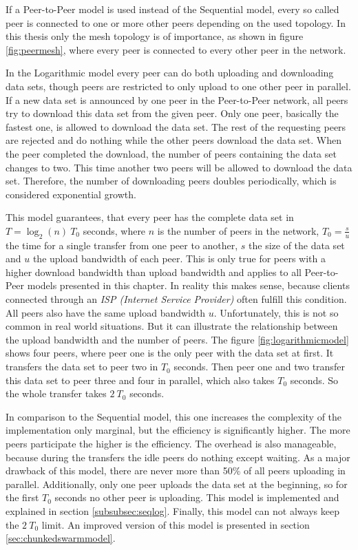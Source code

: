 If a Peer-to-Peer model is used instead of the Sequential model, every so called peer is connected to one or more other peers depending on the used topology. In this thesis only the mesh topology is of importance, as shown in figure \ref{fig:peermesh}, where every peer is connected to every other peer in the network.

In the Logarithmic model every peer can do both uploading and downloading data sets, though peers are restricted to only upload to one other peer in parallel. If a new data set is announced by one peer in the Peer-to-Peer network, all peers try to download this data set from the given peer. Only one peer, basically the fastest one, is allowed to download the data set. The rest of the requesting peers are rejected and do nothing while the other peers download the data set. When the peer completed the download, the number of peers containing the data set changes to two. This time another two peers will be allowed to download the data set. Therefore, the number of downloading peers doubles periodically, which is considered exponential growth.

This model guarantees, that every peer has the complete data set in $T=\log_{2}{(n)}\:T_0$  seconds, where $n$ is the number of peers in the network, $T_0=\frac{s}{u}$ the time for a single transfer from one peer to another, $s$ the size of the data set and $u$ the upload bandwidth of each peer. This is only true for peers with a higher download bandwidth than upload bandwidth and applies to all Peer-to-Peer models presented in this chapter. In reality this makes sense, because clients connected through an \emph{ISP (Internet Service Provider)} often fulfill this condition. All peers also have the same upload bandwidth $u$. Unfortunately, this is not so common in real world situations. But it can illustrate the relationship between the upload bandwidth and the number of peers. The figure \ref{fig:logarithmicmodel} shows four peers, where peer one is the only peer with the data set at first. It transfers the data set to peer two in $T_0$ seconds. Then peer one and two transfer this data set to peer three and four in parallel, which also takes $T_0$ seconds. So the whole transfer takes $2\:T_0$ seconds.

In comparison to the Sequential model, this one increases the complexity of the implementation only marginal, but the efficiency is significantly higher. The more peers participate the higher is the efficiency. The overhead is also manageable, because during the transfers the idle peers do nothing except waiting. As a major drawback of this model, there are never more than 50\% of all peers uploading in parallel. Additionally, only one peer uploads the data set at the beginning, so for the first $T_0$ seconds no other peer is uploading. This model is implemented and explained in section \ref{subsubsec:seqlog}. Finally, this model can not always keep the $2\:T_0$ limit. An improved version of this model is presented in section \ref{sec:chunkedswarmmodel}.

